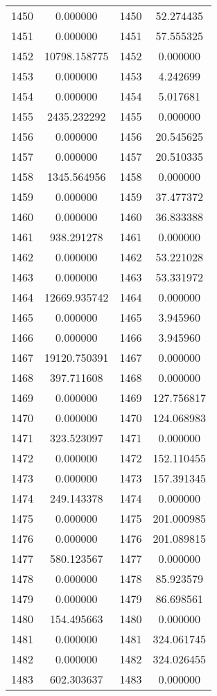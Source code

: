 \documentclass[12pt]{article}
\begin{document}
\begin{longtable}{@{}cccc@{}}
1450 & 0.000000 & 1450 & 52.274435 \\
1451 & 0.000000 & 1451 & 57.555325 \\
1452 & 10798.158775 & 1452 & 0.000000 \\
1453 & 0.000000 & 1453 & 4.242699 \\
1454 & 0.000000 & 1454 & 5.017681 \\
1455 & 2435.232292 & 1455 & 0.000000 \\
1456 & 0.000000 & 1456 & 20.545625 \\
1457 & 0.000000 & 1457 & 20.510335 \\
1458 & 1345.564956 & 1458 & 0.000000 \\
1459 & 0.000000 & 1459 & 37.477372 \\
1460 & 0.000000 & 1460 & 36.833388 \\
1461 & 938.291278 & 1461 & 0.000000 \\
1462 & 0.000000 & 1462 & 53.221028 \\
1463 & 0.000000 & 1463 & 53.331972 \\
1464 & 12669.935742 & 1464 & 0.000000 \\
1465 & 0.000000 & 1465 & 3.945960 \\
1466 & 0.000000 & 1466 & 3.945960 \\
1467 & 19120.750391 & 1467 & 0.000000 \\
1468 & 397.711608 & 1468 & 0.000000 \\
1469 & 0.000000 & 1469 & 127.756817 \\
1470 & 0.000000 & 1470 & 124.068983 \\
1471 & 323.523097 & 1471 & 0.000000 \\
1472 & 0.000000 & 1472 & 152.110455 \\
1473 & 0.000000 & 1473 & 157.391345 \\
1474 & 249.143378 & 1474 & 0.000000 \\
1475 & 0.000000 & 1475 & 201.000985 \\
1476 & 0.000000 & 1476 & 201.089815 \\
1477 & 580.123567 & 1477 & 0.000000 \\
1478 & 0.000000 & 1478 & 85.923579 \\
1479 & 0.000000 & 1479 & 86.698561 \\
1480 & 154.495663 & 1480 & 0.000000 \\
1481 & 0.000000 & 1481 & 324.061745 \\
1482 & 0.000000 & 1482 & 324.026455 \\
1483 & 602.303637 & 1483 & 0.000000 \\

\end{longtable}
\end{document}
